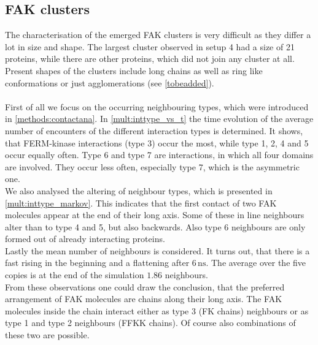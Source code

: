\subsection{FAK clusters}
\label{mult:oligs}
The characterisation of the emerged FAK clusters is very difficult as they differ a lot in size and shape. The largest cluster observed in setup 4 had a size of 21 proteins, while there are other proteins, which did not join any cluster at all. Present shapes of the clusters include long chains as well as ring like conformations or just agglomerations (see \autoref{tobeadded}). \\
\\
First of all we focus on the occurring neighbouring types, which were introduced in \autoref{methods:contactana}. In \autoref{mult:inttype_vs_t} the time evolution of the average number of encounters of the different interaction types is determined. It shows, that FERM-kinase interactions (type 3) occur the most, while type 1, 2, 4 and 5 occur equally often. Type 6 and type 7 are interactions, in which all four domains are involved. They occur less often, especially type 7, which is the asymmetric one.\\
We also analysed the altering of neighbour types, which is presented in \autoref{mult:inttype_markov}. This indicates that the first contact of two FAK molecules appear at the end of their long axis. Some of these in line neighbours alter than to type 4 and 5, but also backwards. Also type 6 neighbours are only formed out of already interacting proteins.\\
Lastly the mean number of neighbours is considered. It turns out, that there is a fast rising in the beginning and a flattening after $6\,\si{\nano\second}$. The average over the five copies is at the end of the simulation $1.86$ neighbours.\\
From these observations one could draw the conclusion, that the preferred arrangement of FAK molecules are chains along their long axis. The FAK molecules inside the chain interact either as type 3 (FK chains) neighbours or as type 1 and type 2 neighbours (FFKK chains). Of course also combinations of these two are possible.
%
%
%
